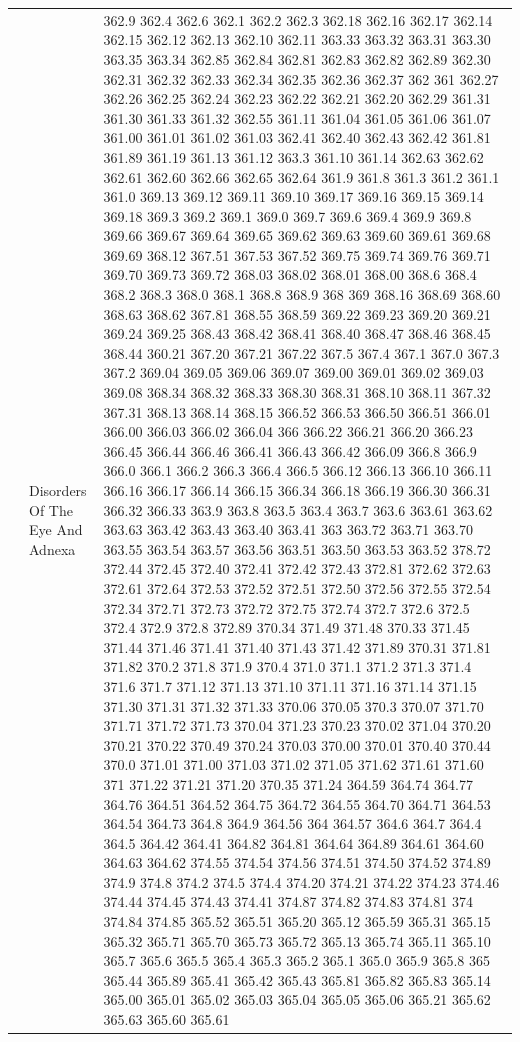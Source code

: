 \documentclass[3p,super,numbers,sort&compress,preprint,10pt]{elsarticle}
\begin{document}
\begin{longtable}{|L{.1in}|L{.6in}||L{5.65in}|}
   & Disorders Of The Eye And Adnexa &   362.9 362.4 362.6 362.1 362.2 362.3 362.18 362.16 362.17 362.14 362.15 362.12 362.13 362.10 362.11 363.33 363.32 363.31 363.30 363.35 363.34 362.85 362.84 362.81 362.83 362.82 362.89 362.30 362.31 362.32 362.33 362.34 362.35 362.36 362.37 362 361 362.27 362.26 362.25 362.24 362.23 362.22 362.21 362.20 362.29 361.31 361.30 361.33 361.32 362.55 361.11 361.04 361.05 361.06 361.07 361.00 361.01 361.02 361.03 362.41 362.40 362.43 362.42 361.81 361.89 361.19 361.13 361.12 363.3 361.10 361.14 362.63 362.62 362.61 362.60 362.66 362.65 362.64 361.9 361.8 361.3 361.2 361.1 361.0 369.13 369.12 369.11 369.10 369.17 369.16 369.15 369.14 369.18 369.3 369.2 369.1 369.0 369.7 369.6 369.4 369.9 369.8 369.66 369.67 369.64 369.65 369.62 369.63 369.60 369.61 369.68 369.69 368.12 367.51 367.53 367.52 369.75 369.74 369.76 369.71 369.70 369.73 369.72 368.03 368.02 368.01 368.00 368.6 368.4 368.2 368.3 368.0 368.1 368.8 368.9 368 369 368.16 368.69 368.60 368.63 368.62 367.81 368.55 368.59 369.22 369.23 369.20 369.21 369.24 369.25 368.43 368.42 368.41 368.40 368.47 368.46 368.45 368.44 360.21 367.20 367.21 367.22 367.5 367.4 367.1 367.0 367.3 367.2 369.04 369.05 369.06 369.07 369.00 369.01 369.02 369.03 369.08 368.34 368.32 368.33 368.30 368.31 368.10 368.11 367.32 367.31 368.13 368.14 368.15 366.52 366.53 366.50 366.51 366.01 366.00 366.03 366.02 366.04 366 366.22 366.21 366.20 366.23 366.45 366.44 366.46 366.41 366.43 366.42 366.09 366.8 366.9 366.0 366.1 366.2 366.3 366.4 366.5 366.12 366.13 366.10 366.11 366.16 366.17 366.14 366.15 366.34 366.18 366.19 366.30 366.31 366.32 366.33 363.9 363.8 363.5 363.4 363.7 363.6 363.61 363.62 363.63 363.42 363.43 363.40 363.41 363 363.72 363.71 363.70 363.55 363.54 363.57 363.56 363.51 363.50 363.53 363.52 378.72 372.44 372.45 372.40 372.41 372.42 372.43 372.81 372.62 372.63 372.61 372.64 372.53 372.52 372.51 372.50 372.56 372.55 372.54 372.34 372.71 372.73 372.72 372.75 372.74 372.7 372.6 372.5 372.4 372.9 372.8 372.89 370.34 371.49 371.48 370.33 371.45 371.44 371.46 371.41 371.40 371.43 371.42 371.89 370.31 371.81 371.82 370.2 371.8 371.9 370.4 371.0 371.1 371.2 371.3 371.4 371.6 371.7 371.12 371.13 371.10 371.11 371.16 371.14 371.15 371.30 371.31 371.32 371.33 370.06 370.05 370.3 370.07 371.70 371.71 371.72 371.73 370.04 371.23 370.23 370.02 371.04 370.20 370.21 370.22 370.49 370.24 370.03 370.00 370.01 370.40 370.44 370.0 371.01 371.00 371.03 371.02 371.05 371.62 371.61 371.60 371 371.22 371.21 371.20 370.35 371.24 364.59 364.74 364.77 364.76 364.51 364.52 364.75 364.72 364.55 364.70 364.71 364.53 364.54 364.73 364.8 364.9 364.56 364 364.57 364.6 364.7 364.4 364.5 364.42 364.41 364.82 364.81 364.64 364.89 364.61 364.60 364.63 364.62 374.55 374.54 374.56 374.51 374.50 374.52 374.89 374.9 374.8 374.2 374.5 374.4 374.20 374.21 374.22 374.23 374.46 374.44 374.45 374.43 374.41 374.87 374.82 374.83 374.81 374 374.84 374.85 365.52 365.51 365.20 365.12 365.59 365.31 365.15 365.32 365.71 365.70 365.73 365.72 365.13 365.74 365.11 365.10 365.7 365.6 365.5 365.4 365.3 365.2 365.1 365.0 365.9 365.8 365 365.44 365.89 365.41 365.42 365.43 365.81 365.82 365.83 365.14 365.00 365.01 365.02 365.03 365.04 365.05 365.06 365.21 365.62 365.63 365.60 365.61 
\end{longtable}
\end{document}
